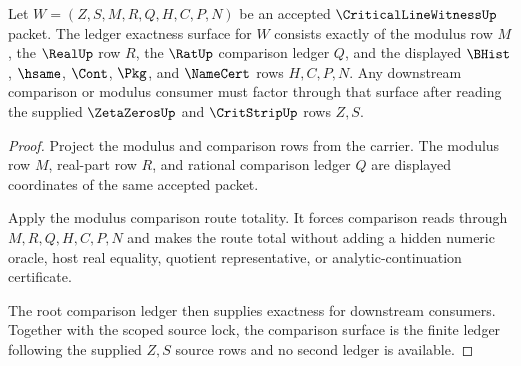 \begin{theorem}
\label{thm:critical-line-witness-scoped-ledger-exactness}
Let $W=(Z,S,M,R,Q,H,C,P,N)$ be an accepted $\CriticalLineWitnessUp$ packet. The ledger exactness surface for $W$ consists exactly of the modulus row $M$, the $\RealUp$ row $R$, the $\RatUp$ comparison ledger $Q$, and the displayed $\BHist$, $\hsame$, $\Cont$, $\Pkg$, and $\NameCert$ rows $H,C,P,N$. Any downstream comparison or modulus consumer must factor through that surface after reading the supplied $\ZetaZerosUp$ and $\CritStripUp$ rows $Z,S$.
\end{theorem}
\begin{proof}
Project the modulus and comparison rows from the carrier. The modulus row $M$, real-part row $R$, and rational comparison ledger $Q$ are displayed coordinates of the same accepted packet.

Apply the modulus comparison route totality. It forces comparison reads through $M,R,Q,H,C,P,N$ and makes the route total without adding a hidden numeric oracle, host real equality, quotient representative, or analytic-continuation certificate.

The root comparison ledger then supplies exactness for downstream consumers. Together with the scoped source lock, the comparison surface is the finite ledger following the supplied $Z,S$ source rows and no second ledger is available.
\end{proof}

